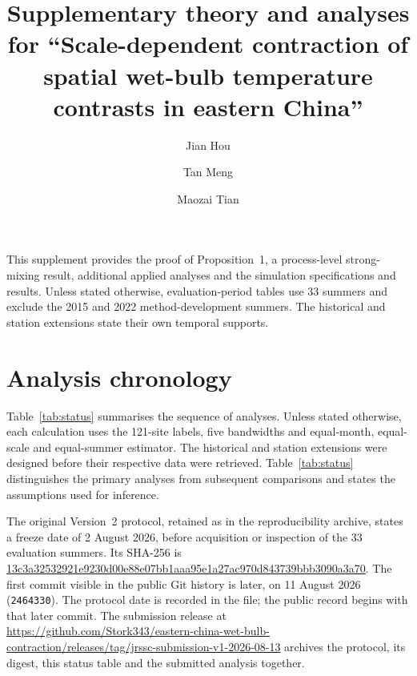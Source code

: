 \documentclass[namedate,webpdf,modern,mediumone]{oup-authoring-template}
\theoremstyle{thmstyleone}
\begin{document}
\copyrightyear{}
\pubyear{}
\title[Supplementary theory and analyses]{Supplementary theory and analyses for ``Scale-dependent
contraction of spatial wet-bulb temperature contrasts in eastern China''}
\author[1]{Jian Hou}
\author[2]{Tan Meng}
\author[2,$\ast$]{Maozai Tian}
\address[1]{, , }
\address[2]{, , }
\abstract{}
\maketitle

This supplement provides the proof of Proposition~1, a process-level
strong-mixing result, additional applied analyses and the simulation
specifications and results. Unless stated otherwise, evaluation-period tables
use 33 summers and exclude the 2015 and 2022 method-development summers. The
historical and station extensions state their own temporal supports.

\section*{Analysis chronology}
\label{sec:status}

Table~\ref{tab:status} summarises the sequence of analyses. Unless stated
otherwise, each calculation uses the 121-site labels, five bandwidths and
equal-month, equal-scale and equal-summer estimator. The historical and station
extensions were designed before their respective data were retrieved. Table~\ref{tab:status} distinguishes the primary analyses from subsequent
comparisons and states the assumptions used for inference.

The original Version~2 protocol, retained as
 in the
reproducibility archive, states a freeze date of 2 August 2026, before
acquisition or inspection of the 33 evaluation summers. Its SHA-256 is
\url{13c3a32532921e9230d00e88e07bb1aaa95e1a27ac970d843739bbb3090a3a70}.
The first
commit visible in the public Git history is later, on 11 August 2026
(\texttt{2464330}). The protocol date is recorded in the file; the public record begins with
that later commit. The submission release at
\url{https://github.com/Stork343/eastern-china-wet-bulb-contraction/releases/tag/jrssc-submission-v1-2026-08-13}
archives the protocol, its digest, this status table and the submitted analysis
together.
\end{document}
